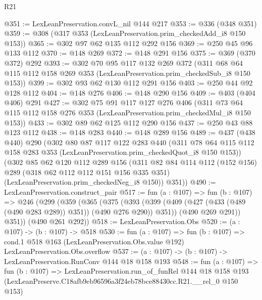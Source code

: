 \begin{lexlean}{R21}
\begin{coremodule}
@351 := LexLeanPreservation.convL_nil @144 @217
@353 := @336 (@348 @351)
@359 := @308 (@317 @353 (LexLeanPreservation.prim_checkedAdd_i8 @150 @153))
@365 := @302 @97 @62 @135 @112 @292 @156
@369 := @250 @45 @96 @133 @112
@370 := @148 @269
@372 := @148 @291 @156
@375 := @369 (@370 @372) @292
@393 := @302
    @70
    @95
    @117
    @132
    @269
    @372
    (@311 @68 @64 @115 @112 @158 @269 @353 (LexLeanPreservation.prim_checkedSub_i8 @150 @153))
@399 := @302 @93 @62 @130 @112 @291 @156
@403 := @250 @44 @92 @128 @112
@404 := @148 @276
@406 := @148 @290 @156
@409 := @403 (@404 @406) @291
@427 := @302
    @75
    @91
    @117
    @127
    @276
    @406
    (@311 @73 @64 @115 @112 @158 @276 @353 (LexLeanPreservation.prim_checkedMul_i8 @150 @153))
@433 := @302 @89 @62 @125 @112 @290 @156
@437 := @250 @43 @88 @123 @112
@438 := @148 @283
@440 := @148 @289 @156
@489 := @437
    (@438 @440)
    @290
    (@302
      @80
      @87
      @117
      @122
      @283
      @440
      (@311 @78 @64 @115 @112 @158 @283 @353 (LexLeanPreservation.prim_checkedQuot_i8 @150 @153))
      (@302
        @85
        @62
        @120
        @112
        @289
        @156
        (@311
          @82
          @84
          @114
          @112
          (@152 @156)
          @289
          (@318 @62 @112 @112 @151 @156 @335 @351)
          (LexLeanPreservation.prim_checkedNeg_i8 @150))
        @351))
@490 := LexLeanPreservation.construct_pair
@517 := fun (a : @107) =>
  fun (b : @107) =>
  @246
    (@299
      (@359
        (@365
          (@375
            (@393 (@399 (@409 (@427 (@433 (@489 (@490 @283 @289)) @351)) (@490 @276 @290)) @351))
            (@490 @269 @291))
          @351))
      (@490 @261 @292))
@518 := LexLeanPreservation.Obs
@520 := (a : @107) -> (b : @107) -> @518
@530 := fun (a : @107) =>
  fun (b : @107) =>
  cond.{1} @518 @163 (LexLeanPreservation.Obs.value @192) LexLeanPreservation.Obs.overflow
@537 := (a : @107) -> (b : @107) -> LexLeanPreservation.RunConv @144 @18 @158 @193
@548 := fun (a : @107) =>
  fun (b : @107) =>
  LexLeanPreservation.run_of_funRel
    @144
    @18
    @158
    @193
    (LexLeanPreserve.C18afb9eb96596a3f24eb78bce88430cc.R21.__rel_0 @150 @153)
\end{coremodule}
\end{lexlean}
